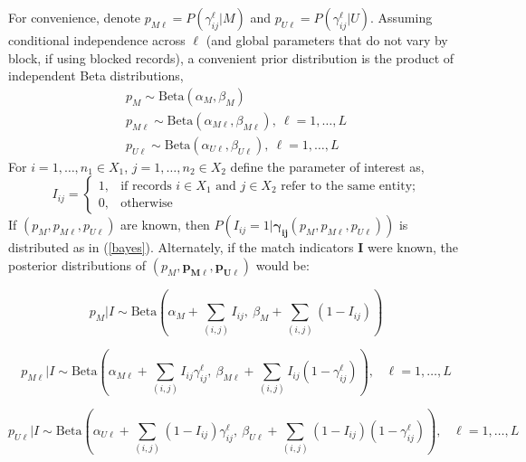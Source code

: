 \documentclass[11pt,reqno]{amsart}
\newcommand\gamij{\mathbf{\gamma_{ij}}}
\newcommand\params{(p_M, p_{M\ell}, p_{U\ell})}
\begin{document}
For convenience, denote $p_{M\ell} = P(\gamma_{ij}^{\ell} | M)$ and $ p_{U\ell} = P(\gamma_{ij}^{\ell} | U)$.  Assuming conditional independence across $\ell$ (and global parameters that do not vary by block, if using blocked records), a convenient prior distribution is the product of independent Beta distributions,
 \begin{gather*}
 p_M \sim \text{Beta}(\alpha_M, \beta_M) \\
 p_{M\ell} \sim \text{Beta}(\alpha_{M\ell}, \beta_{M\ell}), \ \ell = 1,\dots, L \\
  p_{U\ell} \sim \text{Beta}(\alpha_{U\ell}, \beta_{U\ell}), \ \ell = 1,\dots, L 
 \end{gather*}
 For $i=1,\dots,n_1 \in X_1$, $j = 1, \dots, n_2 \in X_2$ define the parameter of interest as,
$$I_{ij} = \begin{cases} 1, & \text{if records $i\in X_1$ and $j\in X_2$ refer to the same entity;} \\ 0, & \text{otherwise} \end{cases} $$  
If $\params$ are known, then $P(I_{ij} = 1 | \gamij \params)$ is distributed as in (\ref{bayes}).  Alternately, if the match indicators $\mathbf{I}$ were known, the posterior distributions of $\left(p_M, \mathbf{p_{M\ell}, p_{U\ell}}\right)$ would be:

\begin{equation}
p_M | I \sim \text{Beta}\left(\alpha_M + \sum_{(i,j)} I_{ij},\ \beta_M + \sum_{(i,j)} (1- I_{ij})\right) 
\label{eq:pM}
\end{equation}

\begin{equation}
p_{M\ell} | I \sim \text{Beta}\left(\alpha_{M\ell} + \sum_{(i,j)} I_{ij}\gamma_{ij}^{\ell},\ \beta_{M\ell} + \sum_{(i,j)} I_{ij} (1-\gamma_{ij}^{\ell})\right), \hspace{10pt} \ell = 1,\dots, L
\label{eq:pML}
\end{equation}

\begin{equation}
p_{U\ell} | I \sim \text{Beta}\left(\alpha_{U\ell} + \sum_{(i,j)}(1-I_{ij})\gamma_{ij}^{\ell},\ \beta_{U\ell} + \sum_{(i,j)}(1-I_{ij})(1-\gamma_{ij}^{\ell})\right), \hspace{10pt} \ell = 1,\dots, L
\label{eq:pUL}
\end{equation}

\end{document}
